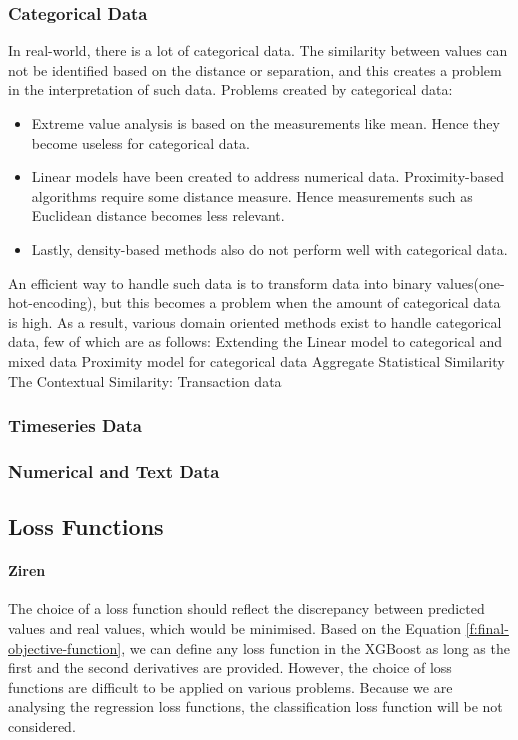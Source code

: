 \documentclass[runningheads]{llncs}
\begin{document}
\subsubsection{Categorical Data} In real-world, there is a lot of categorical data. The similarity between values can not be identified based on the distance or separation, and this creates a problem in the interpretation of such data.
Problems created by categorical data:
\begin{itemize}
     \item Extreme value analysis is based on the measurements like mean. Hence they become useless for categorical data.
    \item Linear models have been created to address numerical data. Proximity-based algorithms require some distance measure. Hence measurements such as Euclidean distance becomes less relevant.
    \item Lastly, density-based methods also do not perform well with categorical data.
\end{itemize}
An efficient way to handle such data is to transform data into binary values(one-hot-encoding), but this becomes a problem when the amount of categorical data is high. As a result, various domain oriented methods exist to handle categorical data, few of which are as follows:
Extending the Linear model to categorical and mixed data
Proximity model for categorical data
Aggregate Statistical Similarity
The Contextual Similarity:
Transaction data

\subsubsection{Timeseries Data}

\subsubsection{Numerical and Text Data}

\subsection{Loss Functions}
\paragraph{Ziren}The choice of a loss function should reflect the discrepancy between predicted values and real values, which would be minimised. Based on the Equation \ref{f:final-objective-function}, we can define any loss function in the XGBoost as long as the first and the second derivatives are provided. However, the choice of loss functions are difficult to be applied on various problems. Because we are analysing the regression loss functions, the classification loss function will be not considered.
\end{document}
